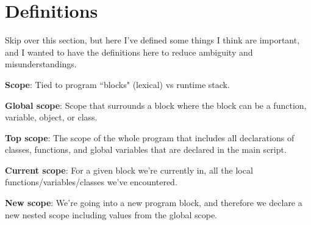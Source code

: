 \documentclass[11pt, oneside]{article}
\begin{document}
\section*{Definitions}
\par Skip over this section, but here I've defined some things I think are important, and I wanted to have the definitions here to reduce ambiguity and misunderstandings. 
\par \textbf{Scope}: Tied to program ``blocks" (lexical) vs runtime stack.
\par \textbf{Global scope}: Scope that surrounds a block where the block can be a function, variable, object, or class.
\par \textbf{Top scope}: The scope of the whole program that includes all declarations of classes, functions, and global variables that are declared in the main script.
\par \textbf{Current scope}: For a given block we're currently in, all the local functions/variables/classes we've encountered.
\par \textbf{New scope}: We're going into a new program block, and therefore we declare a new nested scope including values from the global scope.
\end{document}

